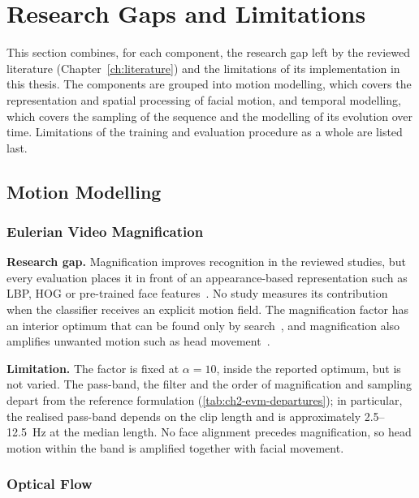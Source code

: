 \section{Research Gaps and Limitations}
\label{sec:gaps-limitations}

This section combines, for each component, the research gap left by the reviewed literature (Chapter~\ref{ch:literature}) and the limitations of its implementation in this thesis. The components are grouped into motion modelling, which covers the representation and spatial processing of facial motion, and temporal modelling, which covers the sampling of the sequence and the modelling of its evolution over time. Limitations of the training and evaluation procedure as a whole are listed last.

\subsection{Motion Modelling}
\label{sec:gaps-motion}

\subsubsection{Eulerian Video Magnification}

\textbf{Research gap.} Magnification improves recognition in the reviewed studies, but every evaluation places it in front of an appearance-based representation such as LBP, HOG or pre-trained face features~\cite{liX2018,bai2021,liY2018,liY2021}. No study measures its contribution when the classifier receives an explicit motion field. The magnification factor has an interior optimum that can be found only by search~\cite{liX2018}, and magnification also amplifies unwanted motion such as head movement~\cite{liX2018}.

\textbf{Limitation.} The factor is fixed at $\alpha = 10$, inside the reported optimum, but is not varied. The pass-band, the filter and the order of magnification and sampling depart from the reference formulation (\autoref{tab:ch2-evm-departures}); in particular, the realised pass-band depends on the clip length and is approximately 2.5--12.5~Hz at the median length. No face alignment precedes magnification, so head motion within the band is amplified together with facial movement.

\subsubsection{Optical Flow}


